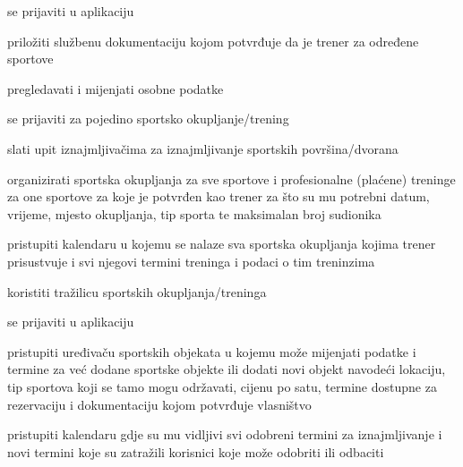 \begin{packed_enum}
				\begin{packed_enum}
					
					\item se prijaviti u aplikaciju
					\item priložiti službenu dokumentaciju kojom potvrđuje da je trener za određene sportove
					\item pregledavati i mijenjati osobne podatke
					\item se prijaviti za pojedino sportsko okupljanje/trening
					\item slati upit iznajmljivačima za iznajmljivanje sportskih površina/dvorana
					\item organizirati sportska okupljanja za sve sportove i profesionalne (plaćene) treninge za one sportove za koje je potvrđen kao trener za što su mu potrebni datum, vrijeme, mjesto okupljanja, tip sporta te maksimalan broj sudionika
					\item pristupiti kalendaru u kojemu se nalaze sva sportska okupljanja kojima trener prisustvuje i svi njegovi termini treninga i podaci o tim treninzima
					\item koristiti tražilicu sportskih okupljanja/treninga
					
				\end{packed_enum}
			
				\item {}
			
				\begin{packed_enum}
				
					\item se prijaviti u aplikaciju
					\item pristupiti uređivaču sportskih objekata u kojemu može mijenjati podatke i termine za već dodane sportske objekte ili dodati novi objekt navodeći lokaciju, tip sportova koji se tamo mogu održavati, cijenu po satu, termine dostupne za rezervaciju i dokumentaciju kojom potvrđuje vlasništvo
					\item pristupiti kalendaru gdje su mu vidljivi svi odobreni termini za iznajmljivanje i novi termini koje su zatražili korisnici koje može odobriti ili odbaciti
					
				\end{packed_enum}
			
				\item {}
			
				\begin{packed_enum}
				

\end{packed_enum}
\end{packed_enum}
